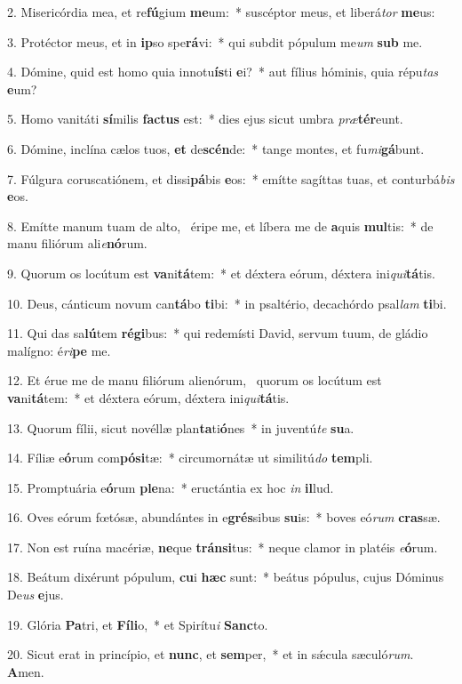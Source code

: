 2. Misericórdia mea, et re\textbf{fú}gium \textbf{me}um:~*  suscéptor meus, et liberá\textit{tor} \textbf{me}us:\

3. Protéctor meus, et in \textbf{ip}so spe\textbf{rá}vi:~*  qui subdit pópulum me\textit{um} \textbf{sub} me.\

4. Dómine, quid est homo quia innotu\textbf{ís}ti \textbf{e}i?~*  aut fílius hóminis, quia répu\textit{tas} \textbf{e}um?\

5. Homo vanitáti \textbf{sí}milis \textbf{fac}\textbf{tus} est:~*  dies ejus sicut umbra \textit{præ}\textbf{tér}eunt.\

6. Dómine, inclína cælos tuos, \textbf{et} de\textbf{scén}de:~*  tange montes, et fu\textit{mi}\textbf{gá}bunt.\

7. Fúlgura coruscatiónem, et dissi\textbf{pá}bis \textbf{e}os:~*  emítte sagíttas tuas, et conturbá\textit{bis} \textbf{e}os.\

8. Emítte manum tuam de alto, \dag\  éripe me, et líbera me de \textbf{a}quis \textbf{mul}tis:~*  de manu filiórum ali\textit{e}\textbf{nó}rum.\

9. Quorum os locútum est \textbf{va}ni\textbf{tá}tem:~*  et déxtera eórum, déxtera ini\textit{qui}\textbf{tá}tis.\

10. Deus, cánticum novum can\textbf{tá}bo \textbf{ti}bi:~*  in psaltério, decachórdo psal\textit{lam} \textbf{ti}bi.\

11. Qui das sa\textbf{lú}tem \textbf{ré}\textbf{gi}bus:~*  qui redemísti David, servum tuum, de gládio malígno: é\textit{ri}\textbf{pe} me.\

12. Et érue me de manu filiórum alienórum, \dag\  quorum os locútum est \textbf{va}ni\textbf{tá}tem:~*  et déxtera eórum, déxtera ini\textit{qui}\textbf{tá}tis.\

13. Quorum fílii, sicut novéllæ plan\textbf{ta}ti\textbf{ó}nes~*  in juventú\textit{te} \textbf{su}a.\

14. Fíliæ e\textbf{ó}rum com\textbf{pó}\textbf{si}tæ:~*  circumornátæ ut similitú\textit{do} \textbf{tem}pli.\

15. Promptuária e\textbf{ó}rum \textbf{ple}na:~*  eructántia ex hoc \textit{in} \textbf{il}lud.\

16. Oves eórum fœtósæ, abundántes in e\textbf{grés}sibus \textbf{su}is:~*  boves eó\textit{rum} \textbf{cras}sæ.\

17. Non est ruína macériæ, \textbf{ne}que \textbf{tráns}\textbf{i}tus:~*  neque clamor in platéis \textit{e}\textbf{ó}rum.\

18. Beátum dixérunt pópulum, \textbf{cu}i \textbf{hæc} sunt:~*  beátus pópulus, cujus Dóminus De\textit{us} \textbf{e}jus.\

19. Glória \textbf{Pa}tri, et \textbf{Fí}\textbf{li}o,~*  et Spirítu\textit{i} \textbf{Sanc}to.\

20. Sicut erat in princípio, et \textbf{nunc}, et \textbf{sem}per,~*  et in sǽcula sæculó\textit{rum}. \textbf{A}men.\

